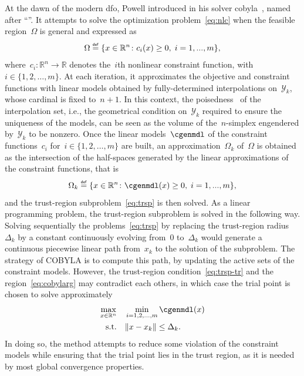 \documentclass[11pt,draft]{article}
\numberwithin{equation}{section}
\def\defeq{\ensuremath{\mathrel{\stackrel{\text{\tiny\textsf{def}}}{=}}}}
\def\R{\ensuremath{\mathbb{R}}}
\newcommand\norm[2][]{#1\|#2#1\|}
\newcommand\set[2][]{#1\{#2#1\}}
\def\srchsp{\ensuremath{\Omega}}
\newcommand\cgen[1][i]{c_{#1}}
\newcommand\srchspmdl[1][k]{\Omega_{#1}}
\newcommand\iter[1][k]{x_{#1}}
\newcommand\trg[1][k]{\Delta_{#1}}
\newcommand\itpls[1][k]{\mathcal{Y}_{#1}}
\begin{document}
At the dawn of the modern \gls{dfo}, Powell introduced in  his solver \gls{cobyla}~\cite{Powell_1994}, named after \enquote{}.
It attempts to solve the optimization problem~\cref{eq:nlc} when the feasible region~$\srchsp$ is general and expressed as
$$\srchsp \defeq \set{x \in \R^n \colon \cgen(x) \ge 0,\; i=1,...,m},$$
where~$\cgen \colon \R^n \to \R$ denotes the~$i$th nonlinear constraint function, with~$i \in \set{1, 2, \dots, m}$.
At each iteration, it approximates the objective and constraint functions with linear models obtained by fully-determined interpolations on~$\itpls$, whose cardinal is fixed to~$n + 1$.
In this context, the poisedness~\cite[\S 1]{Sauer_Xu_1995} of the interpolation set, i.e., the geometrical condition on~$\itpls$ required to ensure the uniqueness of the models, can be seen as the volume of the~$n$-simplex engendered by~$\itpls$ to be nonzero.
Once the linear models~$\cgenmdl$ of the constraint functions~$\cgen$ for~$i \in \set{1, 2, \dots, m}$ are built, an approximation~$\srchspmdl$ of~$\srchsp$ is obtained as the intersection of the half-spaces generated by the linear approximations of the constraint functions, that is
\begin{equation}
    \label{eq:cobylarg}
    \srchspmdl \defeq \set{x \in \R^n \colon \cgenmdl(x) \ge 0,\; i=1,...,m},
\end{equation}
and the trust-region subproblem~\cref{eq:trsp} is then solved.
As a linear programming problem, the trust-region subproblem is solved in the following way.
Solving sequentially the problems~\cref{eq:trsp} by replacing the trust-region radius~$\trg$ by a constant continuously evolving from~$0$ to~$\trg$ would generate a continuous piecewise linear path from~$\iter$ to the solution of the subproblem.
The strategy of COBYLA is to compute this path, by updating the active sets of the constraint models.
However, the trust-region condition~\cref{eq:trsp-tr} and the region~\cref{eq:cobylarg} may contradict each others, in which case the trial point is chosen to solve approximately
\begin{align*}
    \max_{x \in \R^n}   & \quad \min_{i = 1, 2, \dots, m} \cgenmdl(x)\\
    \text{s.t.}         & \quad \norm{x - \iter} \le \trg.
\end{align*}
In doing so, the method attempts to reduce some violation of the constraint models while ensuring that the trial point lies in the trust region, as it is needed by most global convergence properties.
\end{document}
